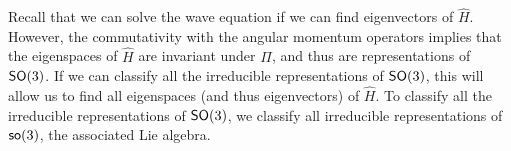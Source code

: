 Recall that we can solve the wave equation if we can find eigenvectors of $\hat{H}$. However, the commutativity with the angular momentum operators implies that the eigenspaces of $\hat{H}$ are invariant under $\Pi$, and thus are representations of $\operatorname{\textsf{SO}}(3)$. If we can classify all the irreducible representations of $\operatorname{\textsf{SO}}(3)$, this will allow us to find all eigenspaces (and thus eigenvectors) of $\hat{H}$. To classify all the irreducible representations of $\operatorname{\textsf{SO}}(3)$, we classify all irreducible representations of $\operatorname{\textsf{so}}(3)$, the associated Lie algebra.
